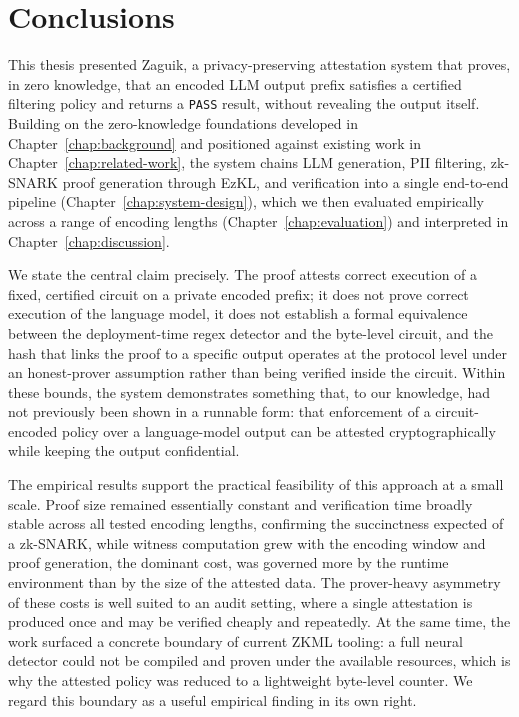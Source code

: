 \chapter{Conclusions}
\label{chap:conclusions}

This thesis presented Zaguik, a privacy-preserving attestation system that proves, in zero knowledge, that an encoded LLM output prefix satisfies a certified filtering policy and returns a \texttt{PASS} result, without revealing the output itself. Building on the zero-knowledge foundations developed in Chapter~\ref{chap:background} and positioned against existing work in Chapter~\ref{chap:related-work}, the system chains LLM generation, PII filtering, zk-SNARK proof generation through EzKL, and verification into a single end-to-end pipeline (Chapter~\ref{chap:system-design}), which we then evaluated empirically across a range of encoding lengths (Chapter~\ref{chap:evaluation}) and interpreted in Chapter~\ref{chap:discussion}.

\medskip

We state the central claim precisely. The proof attests correct execution of a fixed, certified circuit on a private encoded prefix; it does not prove correct execution of the language model, it does not establish a formal equivalence between the deployment-time regex detector and the byte-level circuit, and the hash that links the proof to a specific output operates at the protocol level under an honest-prover assumption rather than being verified inside the circuit. Within these bounds, the system demonstrates something that, to our knowledge, had not previously been shown in a runnable form: that enforcement of a circuit-encoded policy over a language-model output can be attested cryptographically while keeping the output confidential.

\medskip

The empirical results support the practical feasibility of this approach at a small scale. Proof size remained essentially constant and verification time broadly stable across all tested encoding lengths, confirming the succinctness expected of a zk-SNARK, while witness computation grew with the encoding window and proof generation, the dominant cost, was governed more by the runtime environment than by the size of the attested data. The prover-heavy asymmetry of these costs is well suited to an audit setting, where a single attestation is produced once and may be verified cheaply and repeatedly. At the same time, the work surfaced a concrete boundary of current ZKML tooling: a full neural detector could not be compiled and proven under the available resources, which is why the attested policy was reduced to a lightweight byte-level counter. We regard this boundary as a useful empirical finding in its own right.

